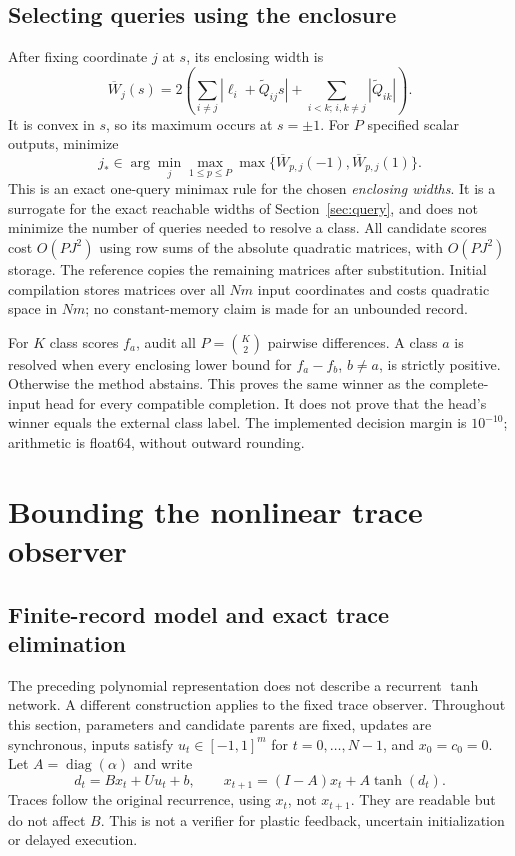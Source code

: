 \documentclass[11pt,a4paper]{article}
\theoremstyle{definition}\newtheorem{definition}[theorem]{Definition}
\begin{document}
\subsection{Selecting queries using the enclosure}
After fixing coordinate $j$ at $s$, its enclosing width is
\begin{equation}
 \overline W_j(s)=2\left(\sum_{i\ne j}|\ell_i+\widetilde Q_{ij}s|
                     +\sum_{i<k;\,i,k\ne j}|\widetilde Q_{ik}|\right).
 \label{eq:polywidth}
\end{equation}
It is convex in $s$, so its maximum occurs at $s=\pm1$. For $P$ specified scalar outputs, minimize
\begin{equation}
 j_*\in\arg\min_j\max_{1\leq p\leq P}
       \max\{\overline W_{p,j}(-1),\overline W_{p,j}(1)\}.
 \label{eq:polypolicy}
\end{equation}
This is an exact one-query minimax rule for the chosen \emph{enclosing widths}. It is a surrogate for the exact reachable widths of Section~\ref{sec:query}, and does not minimize the number of queries needed to resolve a class. All candidate scores cost $O(PJ^2)$ using row sums of the absolute quadratic matrices, with $O(PJ^2)$ storage. The reference copies the remaining matrices after substitution. Initial compilation stores matrices over all $Nm$ input coordinates and costs quadratic space in $Nm$; no constant-memory claim is made for an unbounded record.

For $K$ class scores $f_a$, audit all $P=\binom K2$ pairwise differences. A class $a$ is resolved when every enclosing lower bound for $f_a-f_b$, $b\ne a$, is strictly positive. Otherwise the method abstains. This proves the same winner as the complete-input head for every compatible completion. It does not prove that the head's winner equals the external class label. The implemented decision margin is $10^{-10}$; arithmetic is float64, without outward rounding.

\section{Bounding the nonlinear trace observer}\label{sec:observeraudit}
\subsection{Finite-record model and exact trace elimination}
The preceding polynomial representation does not describe a recurrent $\tanh$ network. A different construction applies to the fixed trace observer. Throughout this section, parameters and candidate parents are fixed, updates are synchronous, inputs satisfy $u_t\in[-1,1]^m$ for $t=0,\ldots,N-1$, and $x_0=c_0=0$. Let $A=\operatorname{diag}(\alpha)$ and write
\begin{equation}
 d_t=Bx_t+Uu_t+b,\qquad x_{t+1}=(I-A)x_t+A\tanh(d_t).
 \label{eq:observertransition}
\end{equation}
Traces follow the original recurrence, using $x_t$, not $x_{t+1}$. They are readable but do not affect $B$. This is not a verifier for plastic feedback, uncertain initialization or delayed execution.
\end{document}
